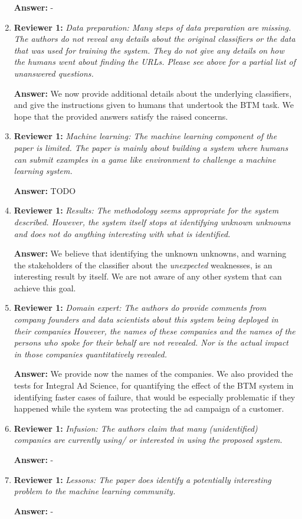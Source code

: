 \documentclass[letterpaper]{article}
\begin{document}
\begin{enumerate}
\textbf{Answer:} -

\item \textbf{Reviewer 1:} \emph{Data preparation: Many steps of data preparation are missing. The authors do not reveal any details about the original classifiers or the data that was used for training the system. They do not give any details on how the humans went about finding the URLs.  Please see above for a partial list of unanswered questions.}

\textbf{Answer:} We now provide additional details about the underlying classifiers, and give the instructions given to humans that undertook the BTM task. We hope that the provided answers satisfy the raised concerns.

\item \textbf{Reviewer 1:} \emph{ Machine learning: The machine learning component of the paper is limited. The paper is mainly about building a system where humans can submit examples in a game like environment to challenge a machine learning system.}

\textbf{Answer:} TODO

\item \textbf{Reviewer 1:} \emph{Results: The methodology seems appropriate for the system described. However, the system itself stops at identifying unknown unknowns and does not do anything interesting with what is identified.}

\textbf{Answer:} We believe that identifying the unknown unknowns, and warning the stakeholders of the classifier about the \emph{unexpected} weaknesses, is an interesting result by itself. We are not aware of any other system that can achieve this goal.

\item \textbf{Reviewer 1:} \emph{Domain expert: The authors do provide comments from company founders and data scientists about this system being deployed in their companies However, the names of these companies and the names of the persons who spoke for their behalf are not revealed. Nor is the actual impact in those companies quantitatively revealed.}

\textbf{Answer:} We provide now the names of the companies. We also provided the tests for Integral Ad Science, for quantifying the effect of the BTM system in identifying faster cases of failure, that would be especially problematic if they happened while the system was protecting the ad campaign of a customer. 

\item \textbf{Reviewer 1:} \emph{Infusion: The authors claim that many (unidentified) companies are currently using/ or interested in using  the proposed system.}

\textbf{Answer:} -

\item \textbf{Reviewer 1:} \emph{Lessons: The paper does identify a potentially interesting problem to the machine learning community.}

\textbf{Answer:} -


\end{enumerate}
\end{document}
